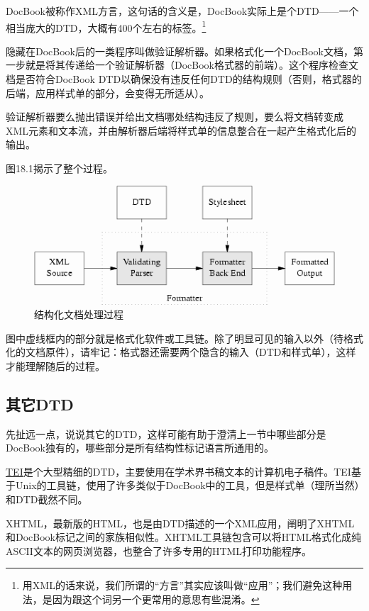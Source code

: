 \documentclass[12pt,oneside]{book}
\begin{document}
DocBook被称作XML方言，这句话的含义是，DocBook实际上是个DTD——一个相当庞大的DTD，大概有400个左右的标签。\footnote{用XML的话来说，我们所谓的“方言”其实应该叫做“应用”；我们避免这种用法，是因为跟这个词另一个更常用的意思有些混淆。}

隐藏在DocBook后的一类程序叫做验证解析器。如果格式化一个DocBook文档，第一步就是将其传递给一个验证解析器（DocBook格式器的前端）。这个程序检查文档是否符合DocBook DTD以确保没有违反任何DTD的结构规则（否则，格式器的后端，应用样式单的部分，会变得无所适从）。

验证解析器要么抛出错误并给出文档哪处结构违反了规则，要么将文档转变成XML元素和文本流，并由解析器后端将样式单的信息整合在一起产生格式化后的输出。

图18.1揭示了整个过程。

\begin{figure}[H]
\centering
\includegraphics[width=\linewidth ,totalheight=0.95\textheight , keepaspectratio]{docflow1.png}
\caption{结构化文档处理过程}
\end{figure}


图中虚线框内的部分就是格式化软件或工具链。除了明显可见的输入以外（待格式化的文档原件），请牢记：格式器还需要两个隐含的输入（DTD和样式单），这样才能理解随后的过程。

\subsection{其它DTD}
先扯远一点，说说其它的DTD，这样可能有助于澄清上一节中哪些部分是DocBook独有的，哪些部分是所有结构性标记语言所通用的。

\href{http://www.tei-c.org/}{TEI}是个大型精细的DTD，主要使用在学术界书稿文本的计算机电子稿件。TEI基于Unix的工具链，使用了许多类似于DocBook中的工具，但是样式单（理所当然）和DTD截然不同。

XHTML，最新版的HTML，也是由DTD描述的一个XML应用，阐明了XHTML和DocBook标记之间的家族相似性。XHTML工具链包含可以将HTML格式化成纯ASCII文本的网页浏览器，也整合了许多专用的HTML打印功能程序。
\end{document}
